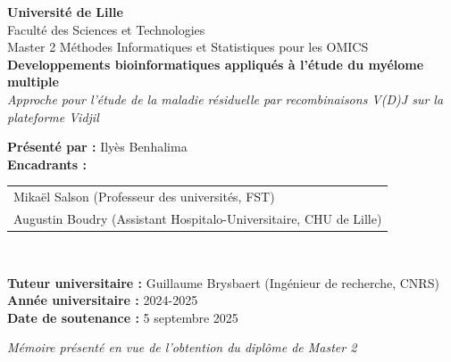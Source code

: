 \begin{titlepage}
    \centering
    \vspace*{1cm}

    {\Large \textbf{Université de Lille}}\\[0.5cm]
    {\large Faculté des Sciences et Technologies}\\[0.5cm]
    {\large Master 2 Méthodes Informatiques et Statistiques pour les OMICS}\\[2cm]

    {\Huge \bfseries Developpements bioinformatiques appliqués à l'étude du myélome multiple}\\[1cm]
    {\LARGE \textit{Approche pour l'étude de la maladie résiduelle par recombinaisons V(D)J sur la plateforme Vidjil}}\\[2.5cm]

    \begin{flushleft}
    \textbf{Présenté par :} Ilyès Benhalima\\
    \textbf{Encadrants :}
    \begin{tabular}[t]{@{}l}
        Mikaël Salson (Professeur des universités, FST) \\
        Augustin Boudry (Assistant Hospitalo-Universitaire, CHU de Lille)
    \end{tabular}\\

    \vspace{1em}

    \textbf{Tuteur universitaire :} Guillaume Brysbaert (Ingénieur de recherche, CNRS)\\[1.5cm]

    \textbf{Année universitaire :} 2024-2025\\
    \textbf{Date de soutenance :} 5 septembre 2025\\
    \end{flushleft}

    \vfill

    \textit{Mémoire présenté en vue de l'obtention du diplôme de Master 2}\\[2cm]


\end{titlepage}
